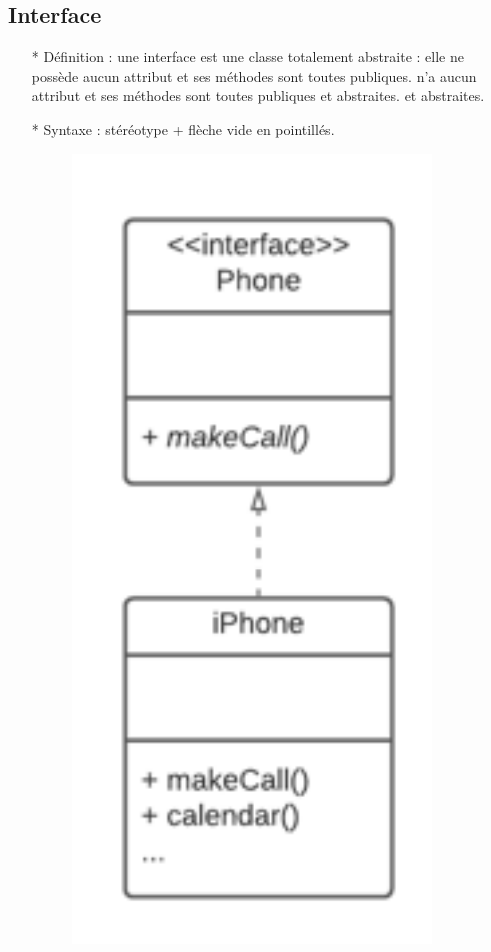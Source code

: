 \documentclass[12pt]{article}
\begin{document}
	\subsection{Interface}
	\begin{itemize}
		\item[* ] Définition : une interface est une classe totalement abstraite : elle ne possède aucun attribut et ses méthodes sont toutes publiques.
		n'a aucun attribut et ses méthodes sont toutes publiques et abstraites.
		et abstraites.
		\newpage
		\item[* ] Syntaxe : stéréotype + flèche vide en pointillés.
			\begin{figure}[!hbtp]
			\centering
			\includegraphics[scale=0.75]{Capture8.PNG}

\end{figure}
\end{itemize}
\end{document}
